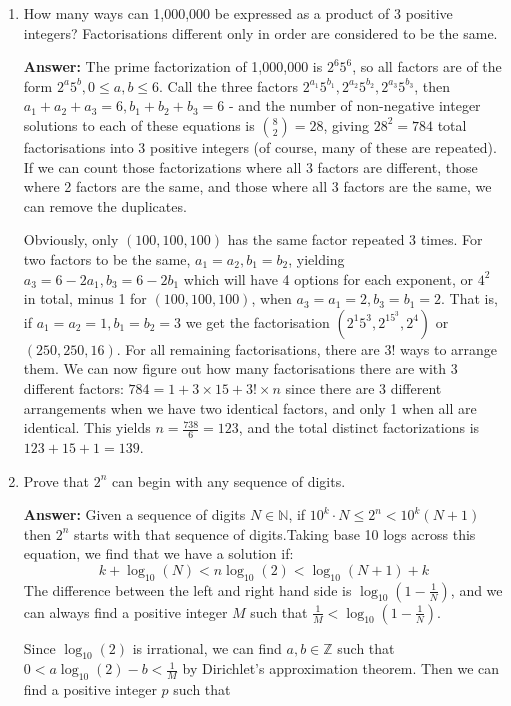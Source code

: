 \documentclass{article}
\begin{document}
\begin{enumerate}
    \item How many ways can 1,000,000 be expressed as a product of 3 positive integers? Factorisations different only in order are considered to be the same.
    
    \textbf{Answer:} The prime factorization of 1,000,000 is $2^6 5^6$, so all factors are of the form $2^a 5^b, 0\leq a,b \leq 6$. Call the three factors $2^{a_1}5^{b_1}, 2^{a_2}5^{b_2}, 2^{a_3}5^{b_3}$, then $a_1+a_2+a_3 = 6, b_1+b_2+b_3 = 6$ - and the number of non-negative integer solutions to each of these equations is $\binom{8}{2} = 28$, giving $28^2 = 784$ total factorisations into 3 positive integers (of course, many of these are repeated). If we can count those factorizations where all 3 factors are different, those where 2 factors are the same, and those where all 3 factors are the same, we can remove the duplicates.
    
    Obviously, only $(100,100,100)$ has the same factor repeated 3 times. For two factors to be the same, $a_1=a_2, b_1=b_2$, yielding $a_3=6-2a_1, b_3=6-2b_1$ which will have 4 options for each exponent, or $4^2$ in total, minus 1 for $(100,100,100)$, when $a_3=a_1=2, b_3=b_1=2$. That is, if $a_1=a_2=1, b_1=b_2=3$ we get the factorisation $(2^1 5^3,2^15^3,2^4)$ or $(250,250,16)$. For all remaining factorisations, there are $3!$ ways to arrange them. We can now figure out how many factorisations there are with 3 different factors: $784 = 1 + 3 \times 15 + 3! \times n$ since there are 3 different arrangements when we have two identical factors, and only 1 when all are identical. This yields $n = \frac{738}{6} = 123$, and the total distinct factorizations is $123 + 15 + 1 = 139$.

    \item Prove that $2^n$ can begin with any sequence of digits.
    
    \textbf{Answer:} Given a sequence of digits $N \in \mathbb{N}$, if $10^k\cdot N \leq 2^n < 10^k(N+1)$ then $2^n$ starts with that sequence of digits.Taking base 10 logs across this equation, we find that we have a solution if:
    \[k + \log_{10} (N) < n \log_{10}(2) < \log_{10}(N+1) + k\]
    The difference between the left and right hand side is $\log_{10}(1 - \frac{1}{N})$, and we can always
    find a positive integer $M$ such that $\frac{1}{M} < \log_{10}(1 - \frac{1}{N})$. 

    Since $\log_{10}(2)$ is irrational, we can find $a,b \in \mathbb{Z}$ such that $0 < a\log_{10}(2)-b < \frac{1}{M}$
    by Dirichlet's approximation theorem. Then we can find a positive integer $p$ such that 


\end{enumerate}
\end{document}
